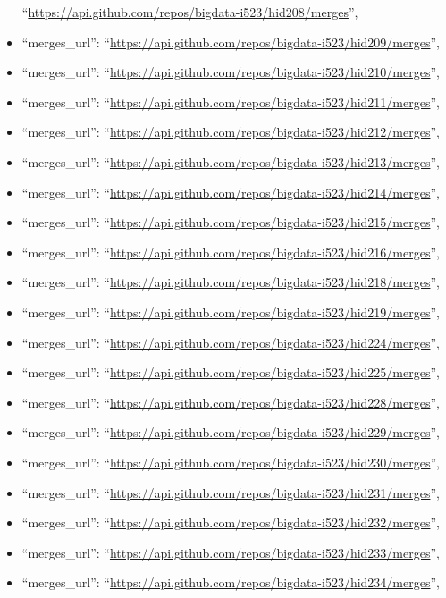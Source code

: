\begin{itemize}
  ``\url{https://api.github.com/repos/bigdata-i523/hid208/merges}'',
\item
  ``merges\_url'':
  ``\url{https://api.github.com/repos/bigdata-i523/hid209/merges}'',
\item
  ``merges\_url'':
  ``\url{https://api.github.com/repos/bigdata-i523/hid210/merges}'',
\item
  ``merges\_url'':
  ``\url{https://api.github.com/repos/bigdata-i523/hid211/merges}'',
\item
  ``merges\_url'':
  ``\url{https://api.github.com/repos/bigdata-i523/hid212/merges}'',
\item
  ``merges\_url'':
  ``\url{https://api.github.com/repos/bigdata-i523/hid213/merges}'',
\item
  ``merges\_url'':
  ``\url{https://api.github.com/repos/bigdata-i523/hid214/merges}'',
\item
  ``merges\_url'':
  ``\url{https://api.github.com/repos/bigdata-i523/hid215/merges}'',
\item
  ``merges\_url'':
  ``\url{https://api.github.com/repos/bigdata-i523/hid216/merges}'',
\item
  ``merges\_url'':
  ``\url{https://api.github.com/repos/bigdata-i523/hid218/merges}'',
\item
  ``merges\_url'':
  ``\url{https://api.github.com/repos/bigdata-i523/hid219/merges}'',
\item
  ``merges\_url'':
  ``\url{https://api.github.com/repos/bigdata-i523/hid224/merges}'',
\item
  ``merges\_url'':
  ``\url{https://api.github.com/repos/bigdata-i523/hid225/merges}'',
\item
  ``merges\_url'':
  ``\url{https://api.github.com/repos/bigdata-i523/hid228/merges}'',
\item
  ``merges\_url'':
  ``\url{https://api.github.com/repos/bigdata-i523/hid229/merges}'',
\item
  ``merges\_url'':
  ``\url{https://api.github.com/repos/bigdata-i523/hid230/merges}'',
\item
  ``merges\_url'':
  ``\url{https://api.github.com/repos/bigdata-i523/hid231/merges}'',
\item
  ``merges\_url'':
  ``\url{https://api.github.com/repos/bigdata-i523/hid232/merges}'',
\item
  ``merges\_url'':
  ``\url{https://api.github.com/repos/bigdata-i523/hid233/merges}'',
\item
  ``merges\_url'':
  ``\url{https://api.github.com/repos/bigdata-i523/hid234/merges}'',

\end{itemize}
